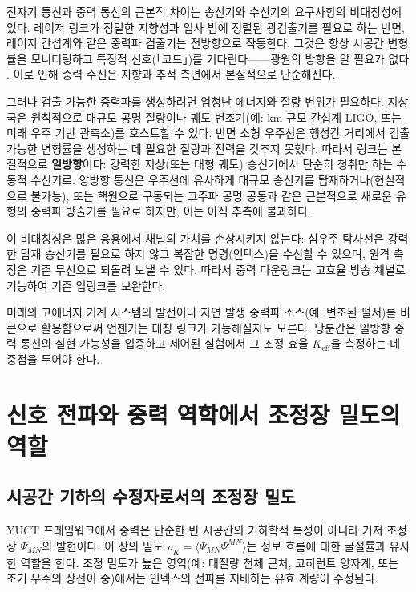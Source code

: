\documentclass[12pt,a4paper]{article}
\begin{document}
	전자기 통신과 중력 통신의 근본적 차이는 송신기와 수신기의 요구사항의 비대칭성에 있다. 레이저 링크가 정밀한 지향성과 입사 빔에 정렬된 광검출기를 필요로 하는 반면, 레이저 간섭계와 같은 중력파 검출기는 전방향으로 작동한다. 그것은 항상 시공간 변형률을 모니터링하고 특징적 신호(「코드」)를 기다린다——광원의 방향을 알 필요가 없다 \cite{LIGO}. 이로 인해 중력 수신은 지향과 추적 측면에서 본질적으로 단순해진다.
	
	그러나 검출 가능한 중력파를 생성하려면 엄청난 에너지와 질량 변위가 필요하다. 지상국은 원칙적으로 대규모 공명 질량이나 궤도 변조기(예: km 규모 간섭계 LIGO, 또는 미래 우주 기반 관측소)를 호스트할 수 있다. 반면 소형 우주선은 행성간 거리에서 검출 가능한 변형률을 생성하는 데 필요한 질량과 전력을 갖추지 못했다. 따라서 링크는 본질적으로 \textbf{일방향}이다: 강력한 지상(또는 대형 궤도) 송신기에서 단순히 청취만 하는 수동적 수신기로. 양방향 통신은 우주선에 유사하게 대규모 송신기를 탑재하거나(현실적으로 불가능), 또는 핵원으로 구동되는 고주파 공명 공동과 같은 근본적으로 새로운 유형의 중력파 방출기를 필요로 하지만, 이는 아직 추측에 불과하다.
	
	이 비대칭성은 많은 응용에서 채널의 가치를 손상시키지 않는다: 심우주 탐사선은 강력한 탑재 송신기를 필요로 하지 않고 복잡한 명령(인덱스)을 수신할 수 있으며, 원격 측정은 기존 무선으로 되돌려 보낼 수 있다. 따라서 중력 다운링크는 고효율 방송 채널로 기능하여 기존 업링크를 보완한다.
	
	미래의 고에너지 기계 시스템의 발전이나 자연 발생 중력파 소스(예: 변조된 펄서)를 비콘으로 활용함으로써 언젠가는 대칭 링크가 가능해질지도 모른다. 당분간은 일방향 중력 통신의 실현 가능성을 입증하고 제어된 실험에서 그 조정 효율 \(K_{\mathrm{eff}}\)을 측정하는 데 중점을 두어야 한다.
	
	\section{신호 전파와 중력 역학에서 조정장 밀도의 역할}
	\label{sec:coord-density}
	
	\subsection{시공간 기하의 수정자로서의 조정장 밀도}
	
	YUCT 프레임워크에서 중력은 단순한 빈 시공간의 기하학적 특성이 아니라 기저 조정장 \(\Psi_{MN}\)의 발현이다. 이 장의 밀도 \(\rho_K = \langle \Psi_{MN}\Psi^{MN} \rangle\)는 정보 흐름에 대한 굴절률과 유사한 역할을 한다. 조정 밀도가 높은 영역(예: 대질량 천체 근처, 코히런트 양자계, 또는 초기 우주의 상전이 중)에서는 인덱스의 전파를 지배하는 유효 계량이 수정된다.
	
\end{document}
